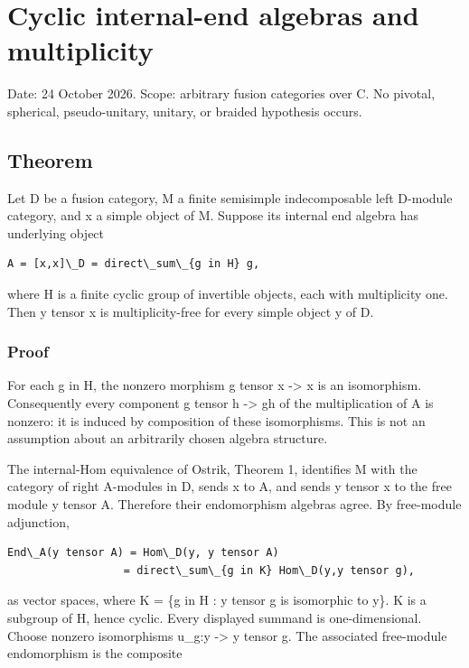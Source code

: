 \hypertarget{cyclic-internal-end-algebras-and-multiplicity}{%
\section{Cyclic internal-end algebras and
multiplicity}\label{cyclic-internal-end-algebras-and-multiplicity}}

Date: 24 October 2026. Scope: arbitrary fusion categories over C. No
pivotal, spherical, pseudo-unitary, unitary, or braided hypothesis
occurs.

\hypertarget{theorem}{%
\subsection{Theorem}\label{theorem}}

Let D be a fusion category, M a finite semisimple indecomposable left
D-module category, and x a simple object of M. Suppose its internal end
algebra has underlying object

\begin{verbatim}
A = [x,x]\_D = direct\_sum\_{g in H} g,
\end{verbatim}

where H is a finite cyclic group of invertible objects, each with
multiplicity one. Then y tensor x is multiplicity-free for every simple
object y of D.

\hypertarget{proof}{%
\subsubsection{Proof}\label{proof}}

For each g in H, the nonzero morphism g tensor x -\textgreater{} x is an
isomorphism. Consequently every component g tensor h -\textgreater{} gh
of the multiplication of A is nonzero: it is induced by composition of
these isomorphisms. This is not an assumption about an arbitrarily
chosen algebra structure.

The internal-Hom equivalence of Ostrik, Theorem 1, identifies M with the
category of right A-modules in D, sends x to A, and sends y tensor x to
the free module y tensor A. Therefore their endomorphism algebras agree.
By free-module adjunction,

\begin{verbatim}
End\_A(y tensor A) = Hom\_D(y, y tensor A)
                  = direct\_sum\_{g in K} Hom\_D(y,y tensor g),
\end{verbatim}

as vector spaces, where K = \{g in H : y tensor g is isomorphic to y\}.
K is a subgroup of H, hence cyclic. Every displayed summand is
one-dimensional. Choose nonzero isomorphisms u\_g:y -\textgreater{} y
tensor g. The associated free-module endomorphism is the composite


